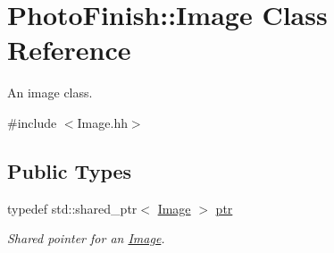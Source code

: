 \hypertarget{class_photo_finish_1_1_image}{}\section{Photo\+Finish\+:\+:Image Class Reference}
\label{class_photo_finish_1_1_image}


An image class.  




{\ttfamily \#include $<$Image.\+hh$>$}

\subsection*{Public Types}
\begin{DoxyCompactItemize}
\item 
typedef std\+::shared\+\_\+ptr$<$ \hyperlink{class_photo_finish_1_1_image}{Image} $>$ \hyperlink{class_photo_finish_1_1_image_ab336203305ed3a1397d7245063353b5a}{ptr}
\begin{DoxyCompactList}\small\item\em Shared pointer for an \hyperlink{class_photo_finish_1_1_image}{Image}. \end{DoxyCompactList}\end{DoxyCompactItemize}
